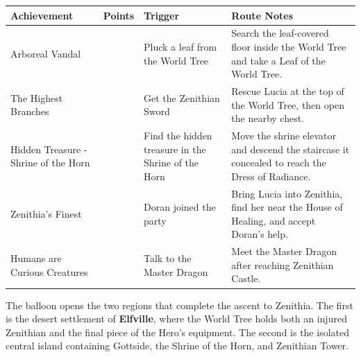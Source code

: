 \documentclass[
  american,
  10pt,
  letterpaper,
  oneside,
  open=any]{scrreprt}
\newcounter{none} %
\newenvironment{guidetable}{%
  \small\setstretch{1.0}%
  \setlength{\tabcolsep}{4pt}%
  \setlength{\LTpre}{8pt}\setlength{\LTpost}{10pt}%
  \renewcommand{\arraystretch}{1.16}%
}{ }
\begin{document}
\begin{guidetable}

{\def\LTcaptype{none} %
\begin{longtable}[]{@{}
  >{\raggedright\arraybackslash}p{}
  >{\raggedleft\arraybackslash}p{}
  >{\raggedright\arraybackslash}p{}
  >{\raggedright\arraybackslash}p{}@{}}
\toprule\noalign{}
\begin{minipage}[b]{\linewidth}\raggedright
\color{GuideGreen}\bfseries Achievement
\end{minipage} & \begin{minipage}[b]{\linewidth}\raggedleft
\color{GuideGreen}\bfseries Points
\end{minipage} & \begin{minipage}[b]{\linewidth}\raggedright
\color{GuideGreen}\bfseries Trigger
\end{minipage} & \begin{minipage}[b]{\linewidth}\raggedright
\color{GuideGreen}\bfseries Route Notes
\end{minipage} \\
\midrule\noalign{}
\endhead
\bottomrule\noalign{}
\endlastfoot
Arboreal Vandal & 5 & Pluck a leaf from the World Tree & Search the
leaf-covered floor inside the World Tree and take a Leaf of the World
Tree. \\
The Highest Branches & 5 & Get the Zenithian Sword & Rescue Lucia at the
top of the World Tree, then open the nearby chest. \\
Hidden Treasure - Shrine of the Horn & 5 & Find the hidden treasure in
the Shrine of the Horn & Move the shrine elevator and descend the
staircase it concealed to reach the Dress of Radiance. \\
Zenithia's Finest & 5 & Doran joined the party & Bring Lucia into
Zenithia, find her near the House of Healing, and accept Doran's
help. \\
Humans are Curious Creatures & 5 & Talk to the Master Dragon & Meet the
Master Dragon after reaching Zenithian Castle. \\
\end{longtable}
}

\end{guidetable}

The balloon opens the two regions that complete the ascent to Zenithia.
The first is the desert settlement of \textbf{Elfville}, where the World
Tree holds both an injured Zenithian and the final piece of the Hero's
equipment. The second is the isolated central island containing
Gottside, the Shrine of the Horn, and Zenithian Tower.
\end{document}
